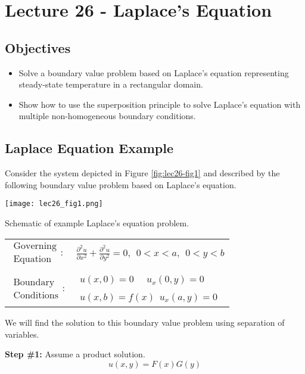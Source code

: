 \chapter{Lecture 26 - Laplace's Equation}
\label{ch:lec26}
\section{Objectives}
\begin{itemize}
\item Solve a boundary value problem based on Laplace's equation representing steady-state temperature in a rectangular domain.
\item Show how to use the superposition principle to solve Laplace's equation with multiple non-homogeneous boundary conditions.
\end{itemize}
\setcounter{lstannotation}{0} %

\section{Laplace Equation Example}
Consider the system depicted in Figure \ref{fig:lec26-fig1} and described by the following boundary value problem based on Laplace's equation.
\begin{marginfigure}
\texttt{[image: lec26\_fig1.png]}
\caption{Schematic of example Laplace's equation problem.}
\label{fig:lec26-fig1}
\end{marginfigure}
\begin{table}[h]
\begin{tabular}{l l}
$\substack{\text{Governing} \\\text{Equation}}: $& $\frac{\partial^2 u}{\partial x^2} + \frac{\partial^2 u}{\partial y^2} = 0, \ \ 0<x<a, \ \ 0<y<b $\\
& \\
$\substack{\text{Boundary} \\ \text{Conditions}}: $ & $\substack{u(x,0)=0  \ \ \ \ \ \ u_x(0,y) = 0 \\ \\ u(x,b) = f(x) \ \ u_x(a,y) = 0}$ 
\end{tabular}
\end{table} 
\noindent We will find the solution to this boundary value problem using separation of variables.

\vspace{0.25cm}

\noindent\textbf{Step \#1:} Assume a product solution.
\begin{equation*}
u(x,y) = F(x)G(y)
\end{equation*}

